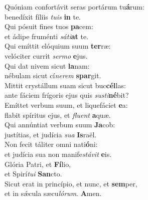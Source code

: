 \evenverse Quóniam confortávit seras portárum tu\textbf{á}rum:~\*\\
\evenverse benedíxit fíliis \textit{tu}\textit{is} \textbf{in} te.\\
\oddverse Qui pósuit fines tuos \textbf{pa}cem:~\*\\
\oddverse et ádipe fruménti \textit{sá}\textit{ti}\textbf{at} te.\\
\evenverse Qui emíttit elóquium suum \textbf{ter}ræ:~\*\\
\evenverse velóciter currit \textit{ser}\textit{mo} \textbf{e}jus.\\
\oddverse Qui dat nivem sicut \textbf{la}nam:~\*\\
\oddverse nébulam sicut cí\textit{ne}\textit{rem} \textbf{spar}git.\\
\evenverse Mittit crystállum suam sicut buc\textbf{cél}las:~\*\\
\evenverse ante fáciem frígoris ejus quis \textit{su}\textit{sti}\textbf{né}bit?\\
\oddverse Emíttet verbum suum, et liquefáciet \textbf{e}a:~\*\\
\oddverse flabit spíritus ejus, et \textit{flu}\textit{ent} \textbf{a}quæ.\\
\evenverse Qui annúntiat verbum suum \textbf{Ja}cob:~\*\\
\evenverse justítias, et judícia \textit{su}\textit{a} \textbf{Is}raël.\\
\oddverse Non fecit táliter omni nati\textbf{ó}ni:~\*\\
\oddverse et judícia sua non manife\textit{stá}\textit{vit} \textbf{e}is.\\
\evenverse Glória Patri, et \textbf{Fí}lio,~\*\\
\evenverse et Spirí\textit{tu}\textit{i} \textbf{San}cto.\\
\oddverse Sicut erat in princípio, et nunc, et \textbf{sem}per,~\*\\
\oddverse et in sǽcula sæcu\textit{ló}\textit{rum}. \textbf{A}men.\\
